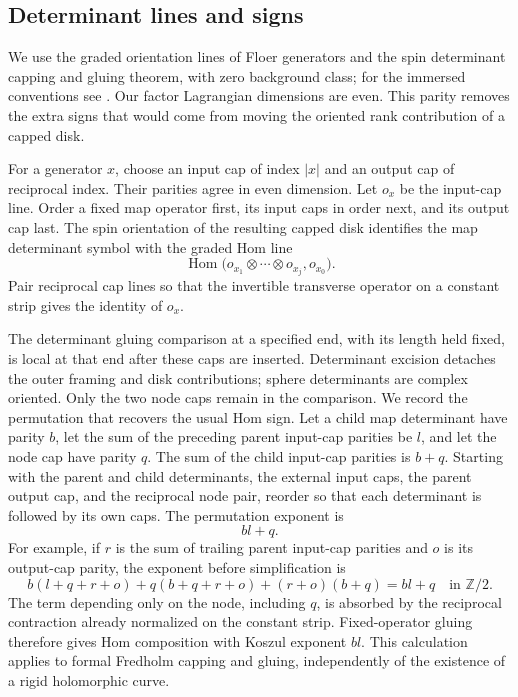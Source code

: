\documentclass[11pt]{article}
\numberwithin{equation}{section}
\theoremstyle{definition}
\theoremstyle{remark}
\begin{document}
\subsection{Determinant lines and signs}
\label{comp:orientations}

We use the graded orientation lines of Floer generators and the
spin determinant capping and gluing theorem, with zero background
class; for the immersed conventions see
\cite[Sections~4--5]{AkahoJoyce}.  Our factor Lagrangian dimensions
are even.  This parity removes the extra signs that would come
from moving the oriented rank contribution of a capped disk.

For a generator $x$, choose an input cap of index $|x|$ and an
output cap of reciprocal index.  Their parities agree in even
dimension.  Let $o_x$ be the input-cap line.  Order a fixed map
operator first, its input caps in order next, and its output cap
last.  The spin orientation of the resulting capped disk
identifies the map determinant symbol with the graded Hom line
\[
 \operatorname{Hom}\bigl(o_{x_1}\otimes\cdots\otimes o_{x_j},o_{x_0}\bigr).
\]
Pair reciprocal cap lines so that the invertible transverse
operator on a constant strip gives the identity of $o_x$.

The determinant gluing comparison at a specified end, with its
length held fixed, is local at that end after these caps are
inserted.  Determinant excision detaches the outer framing and
disk contributions; sphere determinants are complex oriented.
Only the two node caps remain in the comparison.  We record the
permutation that recovers the usual Hom sign.  Let a child map
determinant have parity $b$, let the sum of the preceding parent
input-cap parities be $l$, and let the node cap have parity $q$.
The sum of the child input-cap parities is $b+q$.  Starting with
the parent and child determinants, the external input caps, the
parent output cap, and the reciprocal node pair, reorder so that
each determinant is followed by its own caps.  The permutation
exponent is
\[
 bl+q.
\]
For example, if $r$ is the sum of trailing parent input-cap
parities and $o$ is its output-cap parity, the exponent before
simplification is
\[
 b(l+q+r+o)+q(b+q+r+o)+(r+o)(b+q)=bl+q
 \quad\text{in }\mathbb Z/2.
\]
The term depending only on the node, including $q$, is absorbed by
the reciprocal contraction already normalized on the constant
strip.  Fixed-operator gluing therefore gives Hom composition
with Koszul exponent $bl$.  This calculation applies to formal
Fredholm capping and gluing, independently of the existence of a
rigid holomorphic curve.
\end{document}
